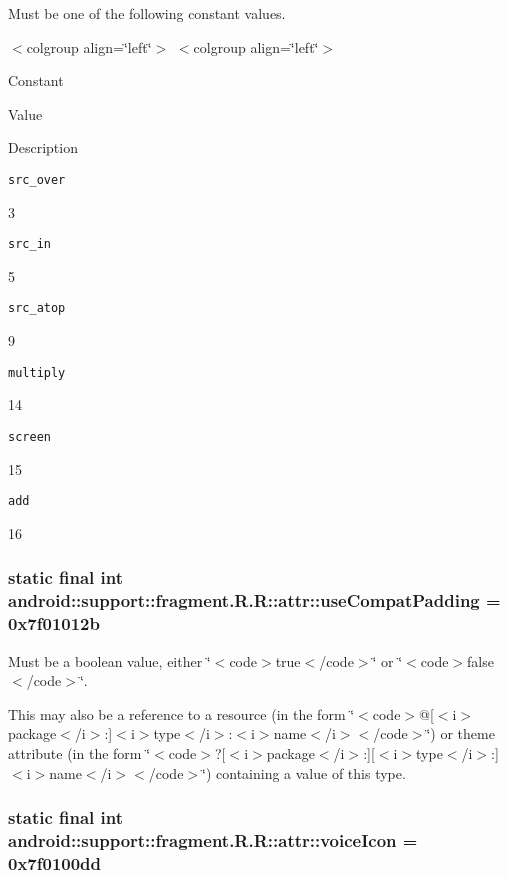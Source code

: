 Must be one of the following constant values. \begin{TabularC}{0}
\hline
\end{TabularC}
$<$colgroup align=\char`\"{}left\char`\"{}$>$ $<$colgroup align=\char`\"{}left\char`\"{}$>$ 

Constant

Value

Description 

{\tt src\_\-over}

3

{\tt src\_\-in}

5

{\tt src\_\-atop}

9

{\tt multiply}

14

{\tt screen}

15

{\tt add}

16\hypertarget{classandroid_1_1support_1_1fragment_1_1_r_1_1attr_7cfbc93c6f3c00aa0c8c65c70bd59c83}{
\subsubsection[{useCompatPadding}]{\setlength{\rightskip}{0pt plus 5cm}static final int android::support::fragment.R.R::attr::useCompatPadding = 0x7f01012b}}
\label{classandroid_1_1support_1_1fragment_1_1_r_1_1attr_7cfbc93c6f3c00aa0c8c65c70bd59c83}


Must be a boolean value, either \char`\"{}$<$code$>$true$<$/code$>$\char`\"{} or \char`\"{}$<$code$>$false$<$/code$>$\char`\"{}. 

This may also be a reference to a resource (in the form \char`\"{}$<$code$>$@\mbox{[}$<$i$>$package$<$/i$>$:\mbox{]}$<$i$>$type$<$/i$>$:$<$i$>$name$<$/i$>$$<$/code$>$\char`\"{}) or theme attribute (in the form \char`\"{}$<$code$>$?\mbox{[}$<$i$>$package$<$/i$>$:\mbox{]}\mbox{[}$<$i$>$type$<$/i$>$:\mbox{]}$<$i$>$name$<$/i$>$$<$/code$>$\char`\"{}) containing a value of this type. \hypertarget{classandroid_1_1support_1_1fragment_1_1_r_1_1attr_b81072e3293f88ed1b6f6a661b95bb29}{
\subsubsection[{voiceIcon}]{\setlength{\rightskip}{0pt plus 5cm}static final int android::support::fragment.R.R::attr::voiceIcon = 0x7f0100dd}}
\label{classandroid_1_1support_1_1fragment_1_1_r_1_1attr_b81072e3293f88ed1b6f6a661b95bb29}



